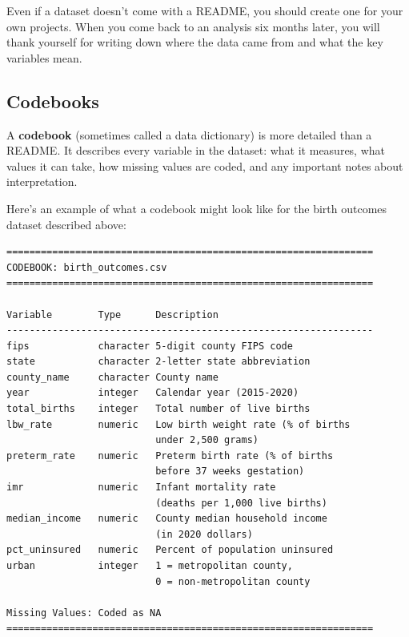 \documentclass[
  letterpaper,
  DIV=11,
  numbers=noendperiod]{scrreprt}
\begin{document}
Even if a dataset doesn't come with a README, you should create one for
your own projects. When you come back to an analysis six months later,
you will thank yourself for writing down where the data came from and
what the key variables mean.

\subsection{Codebooks}\label{codebooks}

A \textbf{codebook} (sometimes called a data dictionary) is more
detailed than a README. It describes every variable in the dataset: what
it measures, what values it can take, how missing values are coded, and
any important notes about interpretation.

Here's an example of what a codebook might look like for the birth
outcomes dataset described above:

\begin{verbatim}
================================================================
CODEBOOK: birth_outcomes.csv
================================================================

Variable        Type      Description
----------------------------------------------------------------
fips            character 5-digit county FIPS code
state           character 2-letter state abbreviation
county_name     character County name
year            integer   Calendar year (2015-2020)
total_births    integer   Total number of live births
lbw_rate        numeric   Low birth weight rate (% of births
                          under 2,500 grams)
preterm_rate    numeric   Preterm birth rate (% of births
                          before 37 weeks gestation)
imr             numeric   Infant mortality rate
                          (deaths per 1,000 live births)
median_income   numeric   County median household income
                          (in 2020 dollars)
pct_uninsured   numeric   Percent of population uninsured
urban           integer   1 = metropolitan county,
                          0 = non-metropolitan county

Missing Values: Coded as NA
================================================================
\end{verbatim}
\end{document}
